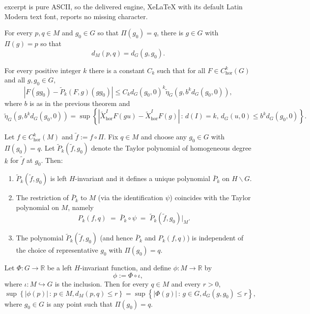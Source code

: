 \documentclass[10pt,a4paper]{amsart}
\begin{document}
excerpt is pure ASCII, so the delivered engine, XeLaTeX with its default Latin Modern text font, reports no missing character.
\begin{proposition}\label{submetrylift}
    For every $p,q\in M$ and $g_0\in G$ so that $\Pi(g_0)=q$, there is $g\in G$ with $\Pi(g)=p$ so that
  $$
  d_M(p,q) = d_G(g,g_0).
  $$
\end{proposition}

\begin{theorem}\label{Taylor}
    For every positive integer $k$ there is a constant $C_k$ such that for all $F\in C^k_{\mathrm{hor}}(G)$ and all $g,g_0\in G$,
    $$
    |F(g g_0)-\tilde P_k(F,g)(g g_0)| \leq C_k d_G(g_0,0)^k
    \tilde \eta_G(g,b^k d_G(g_0,0)),
    $$
where $b$ is as in the previous theorem and 
$$
\tilde \eta_G(g,b^k d_G(g_0,0)) = \sup\left\{|\tilde X_{\mathrm{hor}}^IF(gu)-\tilde X_{\mathrm{hor}}^IF(g)|\,:\, d(I)=k, \, d_G(u,0)\leq b^kd_G(g_0,0)\right\}.
$$   
\end{theorem}

\begin{proposition}
\label{prop:compatibility}
Let \(f\in C_{\mathrm{hor}}^{k}(M)\) and \(\tilde f := f\circ\Pi\).
Fix \(q\in M\) and choose any \(g_0\in G\) with \(\Pi(g_0)=q\).
Let \(\tilde P_k(\tilde f,g_0)\) denote the  Taylor polynomial of homogeneous degree \(k\) for \(\tilde f\) at \(g_0\).
Then:
\begin{enumerate}
\item \(\tilde P_k(\tilde f,g_0)\) is left \(H\)-invariant and it defines a unique polynomial \(\bar P_k\) on \(H\backslash G\).
\item The restriction of \(\bar P_k\) to \(M\) (via the identification \(\psi\)) coincides with the Taylor polynomial on \(M\), namely
\[
P_{k}(f,q) \;=\; \bar P_k\circ\psi \;=\; \tilde P_k(\tilde f,g_0)\big|_{M}.
\]
\item The polynomial \(\tilde P_k(\tilde f,g_0)\) (and hence \(\bar P_k\) and \(P_k(f,q)\)) is independent of the choice of representative \(g_0\) with \(\Pi(g_0)=q\).
\end{enumerate}
\end{proposition}

\begin{lemma}
\label{lem:sup-transfer}

Let $\Phi:G\to\mathbb R$ be a left $H$-invariant function, and define
$\phi:M\to\mathbb R$ by
\[
\phi := \Phi\circ \iota,
\]
where $\iota:M\hookrightarrow G$ is the inclusion.
Then for every $q\in M$ and every $r>0$,
\begin{equation}\label{eq:sup-transfer}
\sup \left\{|\phi(p)|\,:\, p\in M, d_M(p,q)\le r\right\}
=
\sup \left\{|\Phi(g)|\,:\,g\in G, d_G(g,g_0)\le r\right\},
\end{equation}
where $g_0\in G$ is any point such that $\Pi(g_0)=q$.
\end{lemma}
\end{document}
